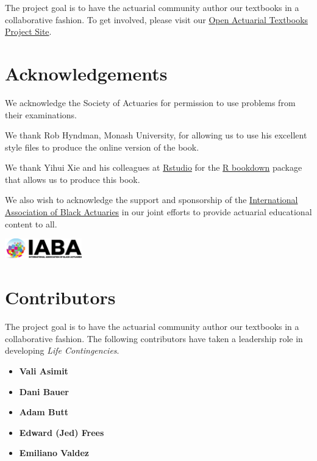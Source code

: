 \documentclass[
]{book}
\providecommand{\tightlist}{%
  \setlength{\itemsep}{0pt}\setlength{\parskip}{0pt}}
\begin{document}
The project goal is to have the actuarial community author our textbooks in a collaborative fashion. To get involved, please visit our
\href{https://sites.google.com/a/wisc.edu/loss-data-analytics/}{Open Actuarial Textbooks Project Site}.

\hypertarget{acknowledgements}{%
\section*{Acknowledgements}\label{acknowledgements}}

We acknowledge the Society of Actuaries for permission to use problems from their examinations.

We thank Rob Hyndman, Monash University, for allowing us to use his excellent style files to produce the online version of the book.

We thank Yihui Xie and his colleagues at \href{https://www.rstudio.com/}{Rstudio} for the \href{https://bookdown.org/yihui/bookdown/}{R bookdown} package that allows us to produce this book.

We also wish to acknowledge the support and sponsorship of the \href{http://www.blackactuaries.org/}{International Association of Black Actuaries} in our joint efforts to provide actuarial educational content to all.

\includegraphics[width=0.25\textwidth,height=\textheight]{Figures/IABA.png}

\hypertarget{contributors}{%
\section*{Contributors}\label{contributors}}

The project goal is to have the actuarial community author our textbooks in a collaborative fashion. The following contributors have taken a leadership role in developing \emph{Life Contingencies}.

\begin{itemize}
\tightlist
\item
  \textbf{Vali Asimit}
\item
  \textbf{Dani Bauer}
\item
  \textbf{Adam Butt}
\item
  \textbf{Edward (Jed) Frees}
\item
  \textbf{Emiliano Valdez}
\end{itemize}
\end{document}

